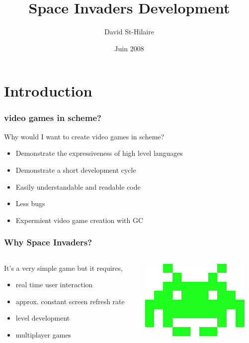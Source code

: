 \documentclass{beamer}
\title{Space Invaders Development}
\author{David St-Hilaire}
\date{Juin 2008}
\newcommand{\<}[1]{\`#1}
\begin{document}
\begin{frame}
\titlepage
\end{frame}


\section{Introduction}

\begin{frame}
  \frametitle{video games in scheme?}
  Why would I want to create video games in scheme?
  \begin{itemize}
  \item Demonstrate the expressiveness of high level languages
  \item Demonstrate a short development cycle
  \item Easily \alert{understandable} and \alert{readable} code
  \item Less bugs
  \item Expermient video game creation with GC
  \end{itemize}
\end{frame}

\begin{frame}
  \frametitle{Why Space Invaders?}

  \begin{columns}[c]
    \begin{column}{7cm} 
      It's a very simple game but it requires,
      \begin{itemize}
      \item real time user interaction
      \item approx. constant screen refresh rate
      \item level development
      \item multiplayer games
      \end{itemize}
    \end{column}
    \begin{column}{5cm} \includegraphics[scale=0.5]{medium} \end{column}
  \end{columns}
\end{frame}
\end{document}
